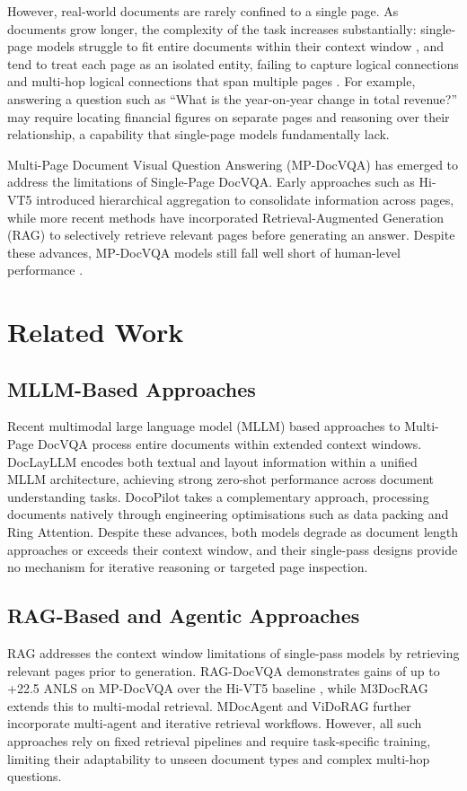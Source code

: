 \documentclass[12pt, a4paper]{article}
\begin{document}
However, real-world documents are rarely confined to a single page. As documents grow longer, the complexity of the task increases substantially: single-page models struggle to fit entire documents within their context window \cite{MP-DocVQA}, and tend to treat each page as an isolated entity, failing to capture logical connections and multi-hop logical connections that span multiple pages \cite{GRAM}. For example, answering a question such as ``What is the year-on-year change in total revenue?'' may require locating financial figures on separate pages and reasoning over their relationship, a capability that single-page models fundamentally lack.

Multi-Page Document Visual Question Answering (MP-DocVQA) has emerged to address the limitations of Single-Page DocVQA. Early approaches such as Hi-VT5 \cite{MP-DocVQA} introduced hierarchical aggregation to consolidate information across pages, while more recent methods have incorporated Retrieval-Augmented Generation (RAG) \cite{RAG-DocVQA} to selectively retrieve relevant pages before generating an answer. Despite these advances, MP-DocVQA models still fall well short of human-level performance \cite{rrcmulti}.

\section*{Related Work}

\subsection*{MLLM-Based Approaches}
Recent multimodal large language model (MLLM) based approaches to Multi-Page DocVQA process entire documents within extended context windows. DocLayLLM \cite{DocLayLLM} encodes both textual and layout information within a unified MLLM architecture, achieving strong zero-shot performance across document understanding tasks. DocoPilot \cite{Docopilot} takes a complementary approach, processing documents natively through engineering optimisations such as data packing and Ring Attention. Despite these advances, both models degrade as document length approaches or exceeds their context window, and their single-pass designs provide no mechanism for iterative reasoning or targeted page inspection.

\subsection*{RAG-Based and Agentic Approaches}
RAG addresses the context window limitations of single-pass models by retrieving relevant pages prior to generation. RAG-DocVQA demonstrates gains of up to +22.5 ANLS on MP-DocVQA over the Hi-VT5 baseline \cite{RAG-DocVQA}, while M3DocRAG \cite{M3DocRAG} extends this to multi-modal retrieval. MDocAgent \cite{MDocAgent} and ViDoRAG \cite{ViDoRAG} further incorporate multi-agent and iterative retrieval workflows. However, all such approaches rely on fixed retrieval pipelines and require task-specific training, limiting their adaptability to unseen document types and complex multi-hop questions.
\end{document}
